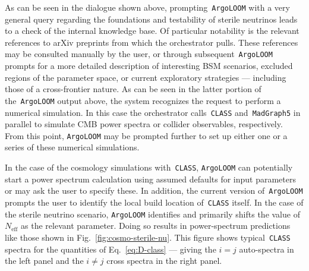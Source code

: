 \documentclass[final,3p,times,sort,compress]{elsarticle}
\newcommand{\AL}{\texttt{ArgoLOOM}\xspace}
\newcommand{\CLASS}{\texttt{CLASS}\xspace}
\newcommand{\MG}{\texttt{MadGraph5}\xspace}
\begin{document}
As can be seen in the dialogue shown above, prompting~\AL with a very general query regarding the foundations and testability of sterile neutrinos leads to a check of the internal knowledge base.
%
Of particular notability is the relevant references to arXiv preprints from which the orchestrator pulls. These references may be consulted manually by the user, or through subsequent~\AL prompts for a more detailed description of interesting BSM scenarios, excluded regions of the parameter space, or current exploratory strategies --- including those of a cross-frontier nature.
%
As can be seen in the latter portion of the~\AL output above, the system recognizes the request to perform a numerical simulation. In this case the orchestrator calls~\CLASS and~\MG in parallel to simulate CMB power spectra or collider observables, respectively.
%
From this point, \AL may be prompted further to set up either one or a series of these numerical simulations.

In the case of the cosmology simulations with~\CLASS, \AL can potentially start a power spectrum calculation using assumed defaults for input parameters or may ask the user to specify these. In addition, the current version of~\AL prompts the user to identify the local build location of~\CLASS itself.
%
In the case of the sterile neutrino scenario, \AL identifies and primarily shifts the value of $N_\mathrm{eff}$ as the relevant parameter. Doing so results in power-spectrum predictions like those
shown in Fig.~\ref{fig:cosmo-sterile-nu}. This figure shows typical~\CLASS spectra for the quantities of Eq.~\ref{eq:D-class} --- giving the $i\!=\!j$ auto-spectra in the left panel and the $i\!\neq\!j$ cross spectra in the right panel.
\end{document}
